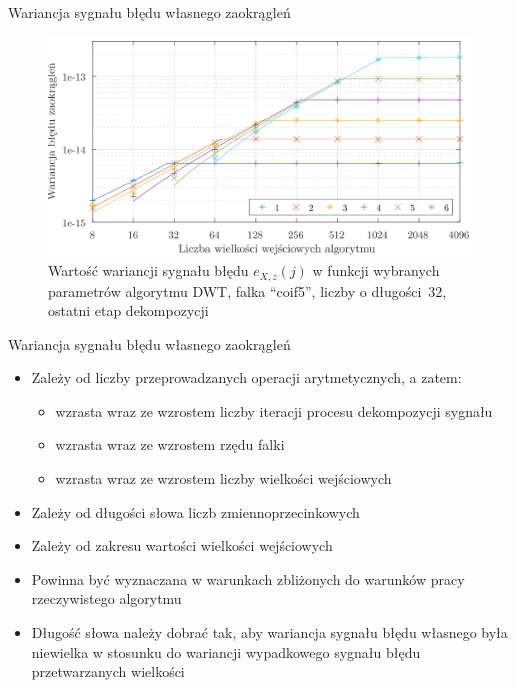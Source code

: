 \documentclass[12pt, polish, aspectratio = 169]{beamer}
\begin{document}
\begin{frame}{Wariancja sygnału błędu własnego zaokrągleń}
\begin{figure}
\includegraphics[scale = 0.75]{obrazki/dwt_rerror_coif5}
\caption{Wartość wariancji sygnału błędu $e_{X,z}(j)$ w funkcji wybranych parametrów algorytmu DWT, falka \enquote{coif5}, liczby o długości~\qty{32}{\bitOw}, ostatni etap dekompozycji}
\end{figure}
\end{frame}

\begin{frame}{Wariancja sygnału błędu własnego zaokrągleń}
\begin{itemize}
\item Zależy od liczby przeprowadzanych operacji arytmetycznych, a zatem:
	\begin{itemize}
	\item wzrasta wraz ze wzrostem liczby iteracji procesu dekompozycji sygnału
	\item wzrasta wraz ze wzrostem rzędu falki
	\item wzrasta wraz ze wzrostem liczby wielkości wejściowych
	\end{itemize}
\item Zależy od długości słowa liczb zmiennoprzecinkowych
\item Zależy od zakresu wartości wielkości wejściowych
\item Powinna być wyznaczana w warunkach zbliżonych do warunków pracy rzeczywistego algorytmu
\item Długość słowa należy dobrać tak, aby wariancja sygnału błędu własnego była niewielka w stosunku do wariancji wypadkowego sygnału błędu przetwarzanych wielkości
\end{itemize}
\end{frame}

\end{document}
